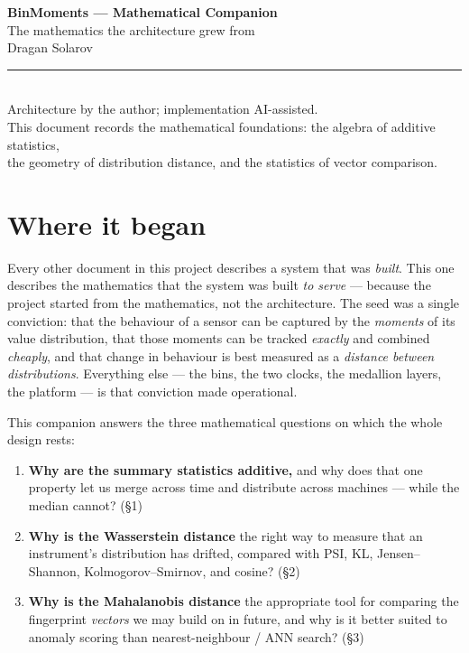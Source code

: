 \documentclass[11pt]{article}
\theoremstyle{definition}
\begin{document}
\begin{center}
  {\LARGE\bfseries\color{accent} BinMoments — Mathematical Companion}\\[0.6em]
  {\large The mathematics the architecture grew from}\\[0.9em]
  {\large\color{ink} Dragan Solarov}\\[1.0em]
  {\color{soft}\rule{0.5\textwidth}{0.4pt}}\\[0.8em]
  {\small Architecture by the author; implementation AI-assisted.\\
  This document records the mathematical foundations: the algebra of additive statistics,\\
  the geometry of distribution distance, and the statistics of vector comparison.}
\end{center}

\vspace{1.2em}

\section*{Where it began}

Every other document in this project describes a system that was \emph{built}. This one describes
the mathematics that the system was built \emph{to serve} --- because the project started from the
mathematics, not the architecture. The seed was a single conviction: that the behaviour of a sensor
can be captured by the \emph{moments} of its value distribution, that those moments can be tracked
\emph{exactly} and combined \emph{cheaply}, and that change in behaviour is best measured as a
\emph{distance between distributions}. Everything else --- the bins, the two clocks, the medallion
layers, the platform --- is that conviction made operational.

This companion answers the three mathematical questions on which the whole design rests:

\begin{enumerate}[leftmargin=1.4em, itemsep=0.3em]
  \item \textbf{Why are the summary statistics additive,} and why does that one property let us
        merge across time and distribute across machines --- while the median cannot? (\S1)
  \item \textbf{Why is the Wasserstein distance} the right way to measure that an instrument's
        distribution has drifted, compared with PSI, KL, Jensen--Shannon, Kolmogorov--Smirnov, and
        cosine? (\S2)
  \item \textbf{Why is the Mahalanobis distance} the appropriate tool for comparing the
        fingerprint \emph{vectors} we may build on in future, and why is it better suited to
        anomaly scoring than nearest-neighbour / ANN search? (\S3)
\end{enumerate}
\end{document}
